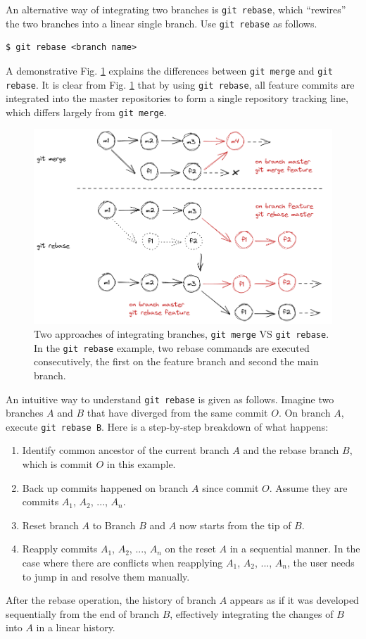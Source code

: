 An alternative way of integrating two branches is \verb|git rebase|, which ``rewires'' the two branches into a linear single branch. Use \verb|git rebase| as follows.
\begin{lstlisting}
$ git rebase <branch name>
\end{lstlisting}
A demonstrative Fig. \ref{ch:sma:fig:gitrebase} explains the differences between \verb|git merge| and \verb|git rebase|. It is clear from Fig. \ref{ch:sma:fig:gitrebase} that by using \verb|git rebase|, all feature commits are integrated into the master repositories to form a single repository tracking line, which differs largely from \verb|git merge|.
\begin{figure}[!htb]
	\centering
	\includegraphics[width=350pt]{chapters/part-3/figures/gitrebase.png}
	\caption{Two approaches of integrating branches, \texttt{git merge} VS \texttt{git rebase}. In the \texttt{git rebase} example, two rebase commands are executed consecutively, the first on the feature branch and second the main branch.} \label{ch:sma:fig:gitrebase}
\end{figure}

An intuitive way to understand \verb|git rebase| is given as follows. Imagine two branches $A$ and $B$ that have diverged from the same commit $O$. On branch $A$, execute \verb|git rebase B|. Here is a step-by-step breakdown of what happens:
\begin{enumerate}
	\item Identify common ancestor of the current branch $A$ and the rebase branch $B$, which is commit $O$ in this example.
	\item Back up commits happened on branch $A$ since commit $O$. Assume they are commits $A_1$, $A_2$, ..., $A_n$.
	\item Reset branch $A$ to Branch $B$ and $A$ now starts from the tip of $B$.
	\item Reapply commits $A_1$, $A_2$, ..., $A_n$ on the reset $A$ in a sequential manner. In the case where there are conflicts when reapplying $A_1$, $A_2$, ..., $A_n$, the user needs to jump in and resolve them manually.
\end{enumerate}
After the rebase operation, the history of branch $A$ appears as if it was developed sequentially from the end of branch $B$, effectively integrating the changes of $B$ into $A$ in a linear history.

